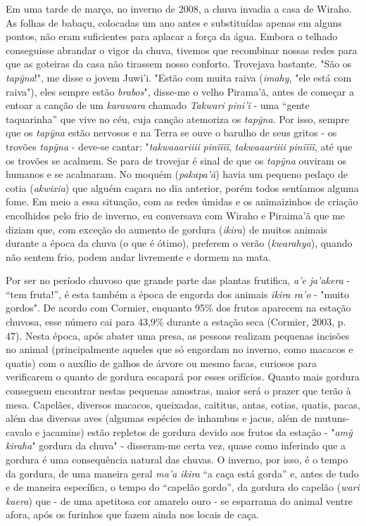 Em uma tarde de março, no inverno de 2008, a chuva invadia a casa de
Wiraho. As folhas de babaçu, colocadas um ano antes e substituídas
apenas em alguns pontos, não eram suficientes para aplacar a força da
água. Embora o telhado conseguisse abrandar o vigor da chuva, tivemos
que recombinar nossas redes para que as goteiras da casa não tirassem
nosso conforto. Trovejava bastante. "São os \emph{tapỹna}!", me disse o
jovem Juwi'i. "Estão com muita raiva (\emph{imahy}, "ele está com
raiva"), eles sempre estão \emph{brabos}", disse-me o velho Pirama'ã,
antes de começar a entoar a canção de um \emph{karawara} chamado
\emph{Takwari} \emph{pini'ĩ} - uma ``gente taquarinha'' que vive no céu,
cuja canção atemoriza os \emph{tapỹna}. Por isso, sempre que os
\emph{tapỹna} estão nervosos e na Terra se ouve o barulho de seus gritos
- os trovões \emph{tapỹna} - deve-se cantar: "\emph{takwaaariiii}
\emph{pinĩĩĩĩ}, \emph{takwaaariiii} \emph{pinĩĩĩĩ}, até que os trovões
se acalmem. Se para de trovejar é sinal de que os \emph{tapỹna} ouviram
os humanos e se acalmaram. No moquém (\emph{pakapa'ã}) havia um pequeno
pedaço de cotia (\emph{akwixia}) que alguém caçara no dia anterior,
porém todos sentíamos alguma fome. Em meio a essa situação, com as redes
úmidas e os animaizinhos de criação encolhidos pelo frio de inverno, eu
conversava com Wiraho e Piraima'ã que me diziam que, com exceção do
aumento de gordura (\emph{ikira}) de muitos animais durante a época da
chuva (o que é ótimo), preferem o verão (\emph{kwarahya}), quando não
sentem frio, podem andar livremente e dormem na mata.

Por ser no período chuvoso que grande parte das plantas frutifica,
\emph{a'e} \emph{ja'akera} - ``tem fruta!'', é esta também a época de
engorda dos animais \emph{ikira ra'o} - "muito gordos". De acordo com
Cormier, enquanto 95\% dos frutos aparecem na estação chuvosa, esse
número cai para 43,9\% durante a estação seca (Cormier, 2003, p. 47).
Nesta época, após abater uma presa, as pessoas realizam pequenas
incisões no animal (principalmente aqueles que só engordam no inverno,
como macacos e quatis) com o auxílio de galhos de árvore ou mesmo facas,
curiosos para verificarem o quanto de gordura escapará por esses
orifícios. Quanto mais gordura conseguem encontrar nestas pequenas
amostras, maior será o prazer que terão à mesa. Capelães, diversos
macacos, queixadas, caititus, antas, cotias, quatis, pacas, além das
diversas aves (algumas espécies de inhambus e jacus, além de
mutuns-cavalo e jacamins) estão repletos de gordura devido aos frutos da
estação - "\emph{amỹ kiraha}" gordura da chuva" - disseram-me certa vez,
quase como inferindo que a gordura é uma consequência natural das
chuvas. O inverno, por isso, é o tempo da gordura, de uma maneira geral
\emph{ma'a ikira} ``a caça está gorda'' e, antes de tudo e de maneira
específica, o tempo do ``capelão gordo'', da gordura do capelão
(\emph{wari kaera}) que - de uma apetitosa cor amarelo ouro - se
esparrama do animal ventre afora, após os furinhos que fazem ainda nos
locais de caça.


